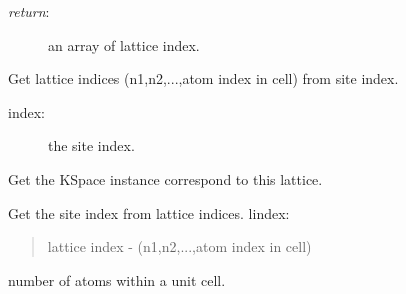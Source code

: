 \documentclass[letterpaper,10pt,oneside,openany]{sphinxmanual}
\begin{document}
\begin{fulllineitems}
\begin{fulllineitems}
\begin{description}
\item[{\emph{return}:}] \leavevmode
an array of lattice index.

\end{description}

\end{fulllineitems}


\begin{fulllineitems}
\label{index:lattice.lattice.Lattice.index2l}
Get lattice indices (n1,n2,...,atom index in cell) from site index.
\begin{description}
\item[{index:}] \leavevmode
the site index.

\end{description}

\end{fulllineitems}


\begin{fulllineitems}
\label{index:lattice.lattice.Lattice.kspace}
Get the KSpace instance correspond to this lattice.

\end{fulllineitems}


\begin{fulllineitems}
\label{index:lattice.lattice.Lattice.l2index}
Get the site index from lattice indices.
lindex:
\begin{quote}

lattice index - (n1,n2,...,atom index in cell)
\end{quote}

\end{fulllineitems}


\begin{fulllineitems}
\label{index:lattice.lattice.Lattice.ncatom}
number of atoms within a unit cell.

\end{fulllineitems}



\end{fulllineitems}
\end{document}
